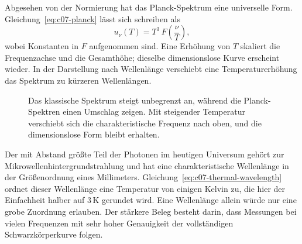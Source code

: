 Abgesehen von der Normierung hat das Planck-Spektrum eine universelle Form. Gleichung~\eqref{eq:c07-planck} lässt sich schreiben als
\begin{equation}
u_\nu(T)=T^3\,F\!\left(\frac{\nu}{T}\right),
\label{eq:c07-scaling-form}
\end{equation}
wobei Konstanten in \(F\) aufgenommen sind. Eine Erhöhung von \(T\) skaliert die Frequenzachse und die Gesamthöhe; dieselbe dimensionslose Kurve erscheint wieder. In der Darstellung nach Wellenlänge verschiebt eine Temperaturerhöhung das Spektrum zu kürzeren Wellenlängen.

\begin{figure}[htbp]
\centering
{}
\caption{Das klassische Spektrum steigt unbegrenzt an, während die Planck-Spektren einen Umschlag zeigen. Mit steigender Temperatur verschiebt sich die charakteristische Frequenz nach oben, und die dimensionslose Form bleibt erhalten.}
\label{fig:c07-planck-redraw}
\end{figure}

Der mit Abstand größte Teil der Photonen im heutigen Universum gehört zur Mikrowellenhintergrundstrahlung und hat eine charakteristische Wellenlänge in der Größenordnung eines Millimeters. Gleichung~\eqref{eq:c07-thermal-wavelength} ordnet dieser Wellenlänge eine Temperatur von einigen Kelvin zu, die hier der Einfachheit halber auf \(3\,\mathrm{K}\) gerundet wird. Eine Wellenlänge allein würde nur eine grobe Zuordnung erlauben. Der stärkere Beleg besteht darin, dass Messungen bei vielen Frequenzen mit sehr hoher Genauigkeit der vollständigen Schwarzkörperkurve folgen.

\begin{classroomqa}
\end{classroomqa}

